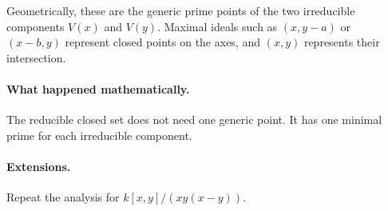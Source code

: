 Geometrically, these are the generic prime points of the two irreducible components
\(V(x)\) and \(V(y)\).  Maximal ideals such as \((x,y-a)\) or \((x-b,y)\) represent closed
points on the axes, and \((x,y)\) represents their intersection.

\paragraph{What happened mathematically.}
The reducible closed set does not need one generic point.  It has one minimal prime for each
irreducible component.

\paragraph{Extensions.}
Repeat the analysis for \(k[x,y]/(xy(x-y))\).
\fi
